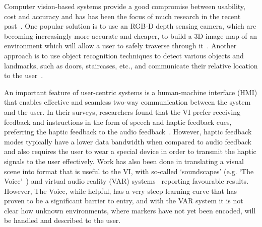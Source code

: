 \documentclass[format=sigconf, review=true, screen=true, anonymous=true]{acmart}
\begin{document}
Computer vision-based systems provide a good compromise between usability, cost and accuracy and has has been the focus of much research in the recent past~\cite{manduchi2014last}. One popular solution is to use an RGB-D depth sensing camera, which are becoming increasingly more accurate and cheaper, to build a 3D image map of an environment which will allow a user to safely traverse through it~\cite{lee2015, rodriguez2012obstacle}. Another approach is to use object recognition techniques to detect various objects and landmarks, such as doors, staircases, etc., and communicate their relative location to the user~\cite{tian2013b}.%



An important feature of user-centric systems is a human-machine interface (HMI) that enables effective and seamless two-way communication between the system and the user. In their surveys, researchers found that the VI prefer receiving feedback and instructions in the form of speech and haptic feedback cues, preferring the haptic feedback to the audio feedback~\cite{khoo2016multimodal, ross2000wearable}. However, haptic feedback modes typically have a lower data bandwidth when compared to audio feedback and also requires the user to wear a special device in order to transmit the haptic signals to the user effectively. Work has also been done in translating a visual scene into format that is useful to the VI, with so-called `soundscapes' (e.g. `The Voice'~\cite{meijer2010}) and virtual audio reality (VAR) systems~\cite{frauenberger2003} reporting favourable results. However, The Voice, while helpful, has a very steep learning curve that has proven to be a significant barrier to entry, and with the VAR system it is not clear how unknown environments, where markers have not yet been encoded, will be handled and described to the user. 
\end{document}
